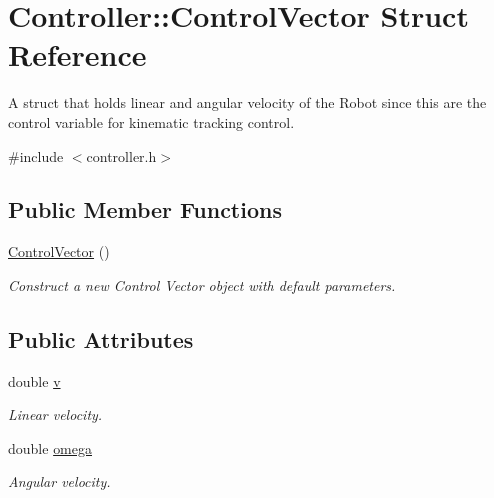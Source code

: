 \hypertarget{structController_1_1ControlVector}{}\section{Controller\+:\+:Control\+Vector Struct Reference}
\label{structController_1_1ControlVector}


A struct that holds linear and angular velocity of the Robot since this are the control variable for kinematic tracking control.  




{\ttfamily \#include $<$controller.\+h$>$}

\subsection*{Public Member Functions}
\begin{DoxyCompactItemize}
\item 
\hyperlink{structController_1_1ControlVector_abf98db4ce95ac636bb5ac950b6b820b3}{Control\+Vector} ()\hypertarget{structController_1_1ControlVector_abf98db4ce95ac636bb5ac950b6b820b3}{}\label{structController_1_1ControlVector_abf98db4ce95ac636bb5ac950b6b820b3}

\begin{DoxyCompactList}\small\item\em Construct a new Control Vector object with default parameters. \end{DoxyCompactList}\end{DoxyCompactItemize}
\subsection*{Public Attributes}
\begin{DoxyCompactItemize}
\item 
double \hyperlink{structController_1_1ControlVector_af8d8ff93ddf343a13a35bba355d39976}{v}\hypertarget{structController_1_1ControlVector_af8d8ff93ddf343a13a35bba355d39976}{}\label{structController_1_1ControlVector_af8d8ff93ddf343a13a35bba355d39976}

\begin{DoxyCompactList}\small\item\em Linear velocity. \end{DoxyCompactList}\item 
double \hyperlink{structController_1_1ControlVector_ad5963169c4ea0c021cb923191aef7ed3}{omega}\hypertarget{structController_1_1ControlVector_ad5963169c4ea0c021cb923191aef7ed3}{}\label{structController_1_1ControlVector_ad5963169c4ea0c021cb923191aef7ed3}

\begin{DoxyCompactList}\small\item\em Angular velocity. \end{DoxyCompactList}\end{DoxyCompactItemize}


